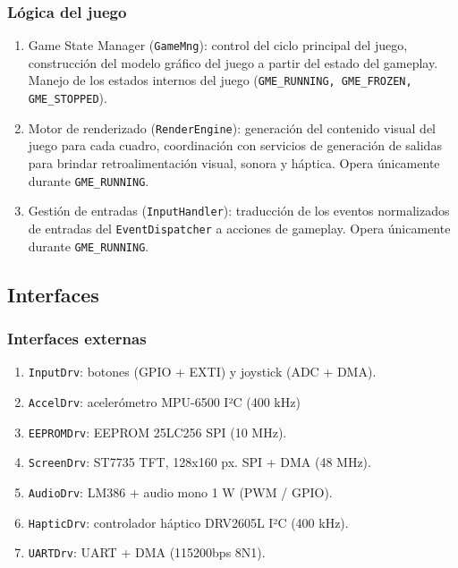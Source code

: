 \documentclass[11pt,a4paper]{article}
\begin{document}
\subsubsection{Lógica del juego}
\begin{enumerate}
    \item Game State Manager (\texttt{GameMng}): control del ciclo principal del juego, construcción del modelo gráfico del juego a partir del estado del gameplay. Manejo de los estados internos del juego (\texttt{GME\_RUNNING, GME\_FROZEN, GME\_STOPPED}).
    \item Motor de renderizado (\texttt{RenderEngine}): generación del contenido visual del juego para cada cuadro, coordinación con servicios de generación de salidas para brindar retroalimentación visual, sonora y háptica. Opera únicamente durante \texttt{GME\_RUNNING}.
    \item Gestión de entradas (\texttt{InputHandler}): traducción de los eventos normalizados de entradas del \texttt{EventDispatcher} a acciones de gameplay. Opera únicamente durante \texttt{GME\_RUNNING}.
\end{enumerate}


\subsection{Interfaces}

\subsubsection{Interfaces externas}
\begin{enumerate}
    \item \texttt{InputDrv}: botones (GPIO + EXTI) y joystick (ADC + DMA).
    \item \texttt{AccelDrv}: acelerómetro MPU-6500 I²C (400 kHz)
    \item \texttt{EEPROMDrv}: EEPROM 25LC256 SPI (10 MHz).
    \item \texttt{ScreenDrv}: ST7735 TFT, 128x160 px. SPI + DMA (48 MHz).
    \item \texttt{AudioDrv}: LM386 + audio mono 1 W (PWM / GPIO).
    \item \texttt{HapticDrv}: controlador háptico DRV2605L I²C (400 kHz).
    \item \texttt{UARTDrv}: UART + DMA (115200bps 8N1).
\end{enumerate}
\end{document}
